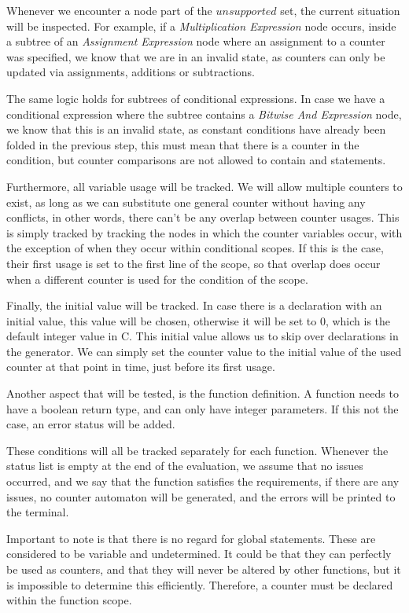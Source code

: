\documentclass[12pt]{article}
\begin{document}
Whenever we encounter a node part of the $unsupported$ set, the current situation will be inspected. For example, if a \textit{Multiplication Expression} node occurs, inside a subtree of an \textit{Assignment Expression} node where an assignment to a counter was specified, we know that we are in an invalid state, as counters can only be updated via assignments, additions or subtractions. 

The same logic holds for subtrees of conditional expressions. In case we have a conditional expression where the subtree contains a \textit{Bitwise And Expression} node, we know that this is an invalid state, as constant conditions have already been folded in the previous step, this must mean that there is a counter in the condition, but counter comparisons are not allowed to contain and statements.

Furthermore, all variable usage will be tracked. We will allow multiple counters to exist, as long as we can substitute one general counter without having any conflicts, in other words, there can't be any overlap between counter usages. This is simply tracked by tracking the nodes in which the counter variables occur, with the exception of when they occur within conditional scopes. If this is the case, their first usage is set to the first line of the scope, so that overlap does occur when a different counter is used for the condition of the scope. 

Finally, the initial value will be tracked. In case there is a declaration with an initial value, this value will be chosen, otherwise it will be set to 0, which is the default integer value in C. This initial value allows us to skip over declarations in the generator. We can simply set the counter value to the initial value of the used counter at that point in time, just before its first usage.

Another aspect that will be tested, is the function definition. A function needs to have a boolean return type, and can only have integer parameters. If this not the case, an error status will be added.

These conditions will all be tracked separately for each function. Whenever the status list is empty at the end of the evaluation, we assume that no issues occurred, and we say that the function satisfies the requirements, if there are any issues, no counter automaton will be generated, and the errors will be printed to the terminal.

Important to note is that there is no regard for global statements. These are considered to be variable and undetermined. It could be that they can perfectly be used as counters, and that they will never be altered by other functions, but it is impossible to determine this efficiently. Therefore, a counter must be declared within the function scope.
\end{document}
